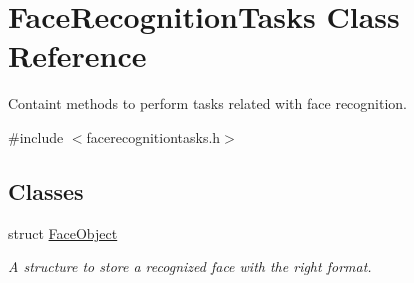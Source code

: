 \hypertarget{class_face_recognition_tasks}{}\section{Face\+Recognition\+Tasks Class Reference}
\label{class_face_recognition_tasks}


Containt methods to perform tasks related with face recognition.  




{\ttfamily \#include $<$facerecognitiontasks.\+h$>$}

\subsection*{Classes}
\begin{DoxyCompactItemize}
\item 
struct \hyperlink{struct_face_recognition_tasks_1_1_face_object}{Face\+Object}
\begin{DoxyCompactList}\small\item\em A structure to store a recognized face with the right format. \end{DoxyCompactList}\end{DoxyCompactItemize}
